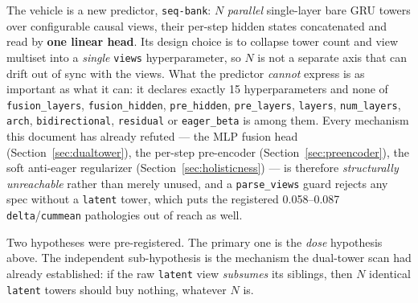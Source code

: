 \documentclass[11pt]{article}
\begin{document}
The vehicle is a new predictor, \texttt{seq-bank}: $N$ \emph{parallel}
single-layer bare GRU towers over configurable causal views, their per-step
hidden states concatenated and read by \textbf{one linear head}. Its design
choice is to collapse tower count and view multiset into a \emph{single}
\texttt{views} hyperparameter, so $N$ is not a separate axis that can drift out of
sync with the views. What the predictor \emph{cannot} express is as important as
what it can: it declares exactly \num{15} hyperparameters and none of
\texttt{fusion\_layers}, \texttt{fusion\_hidden}, \texttt{pre\_hidden},
\texttt{pre\_layers}, \texttt{layers}, \texttt{num\_layers}, \texttt{arch},
\texttt{bidirectional}, \texttt{residual} or \texttt{eager\_beta} is among them.
Every mechanism this document has already refuted --- the MLP fusion head
(Section~\ref{sec:dualtower}), the per-step pre-encoder
(Section~\ref{sec:preencoder}), the soft anti-eager regularizer
(Section~\ref{sec:holisticness}) --- is therefore \emph{structurally unreachable}
rather than merely unused, and a \texttt{parse\_views} guard rejects any spec
without a \texttt{latent} tower, which puts the registered
\numrange{0.058}{0.087} \texttt{delta}/\texttt{cummean} pathologies out of reach
as well.

Two hypotheses were pre-registered. The primary one is the \emph{dose}
hypothesis above. The independent sub-hypothesis is the mechanism the dual-tower
scan had already established: if the raw \texttt{latent} view \emph{subsumes} its
siblings, then $N$ identical \texttt{latent} towers should buy nothing, whatever
$N$ is.
\end{document}
